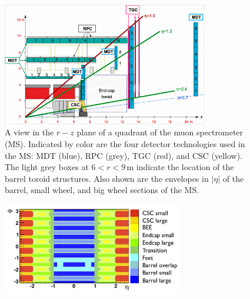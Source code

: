 \begin{figure}[!htb]
    \begin{center}
        \includegraphics[width=0.8\textwidth]{figures/chapter2/muon_spec/atlas_muon_plan_view_eta}
        \caption{
            A view in the $r-z$ plane of a quadrant of the muon spectrometer (MS).
            Indicated by color are the four detector technologies used in the MS:
            MDT (blue), RPC (grey), TGC (red), and CSC (yellow).
            The light grey boxes at $6 < r < 9$\,m indicate the location of the
            barrel toroid structures.
            Also shown are the envelopes in $\lvert \eta \rvert$ of the barrel,
            small wheel, and big wheel sections of the MS.
        }
        \label{fig:muon_plan_view_eta}
    \end{center}
\end{figure}
\FloatBarrier

\begin{figure}[!htb]
    \begin{center}
        \includegraphics[width=0.7\textwidth]{figures/chapter2/muon_spec/atlas_muon_overlap}
        \caption{
        }
        \label{fig:muon_overlap}
    \end{center}
\end{figure}

